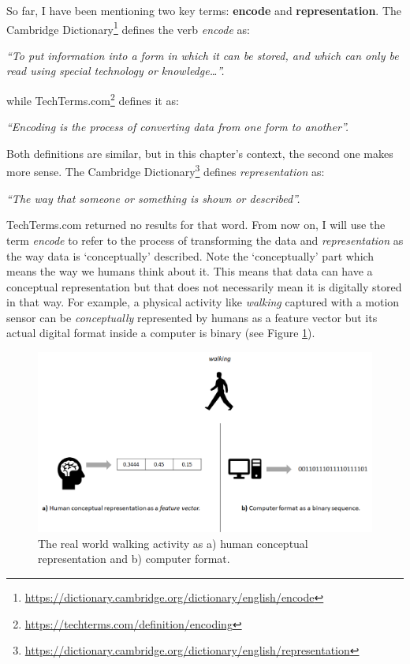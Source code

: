 \documentclass[
  11pt,
]{krantz}
\renewenvironment{quote}{\begin{VF}}{\end{VF}}
\begin{document}
So far, I have been mentioning two key terms: \textbf{encode} and \textbf{representation}. The Cambridge Dictionary\footnote{\url{https://dictionary.cambridge.org/dictionary/english/encode}} defines the verb \emph{encode} as:

\begin{quote}
\emph{``To put information into a form in which it can be stored, and which can only be read using special technology or knowledge\ldots{}''.}
\end{quote}

while TechTerms.com\footnote{\url{https://techterms.com/definition/encoding}} defines it as:

\begin{quote}
\emph{``Encoding is the process of converting data from one form to another''.}
\end{quote}

Both definitions are similar, but in this chapter's context, the second one makes more sense. The Cambridge Dictionary\footnote{\url{https://dictionary.cambridge.org/dictionary/english/representation}} defines \emph{representation} as:

\begin{quote}
\emph{``The way that someone or something is shown or described''.}
\end{quote}

TechTerms.com returned no results for that word. From now on, I will use the term \emph{encode} to refer to the process of transforming the data and \emph{representation} as the way data is `conceptually' described. Note the `conceptually' part which means the way we humans think about it. This means that data can have a conceptual representation but that does not necessarily mean it is digitally stored in that way. For example, a physical activity like \emph{walking} captured with a motion sensor can be \emph{conceptually} represented by humans as a feature vector but its actual digital format inside a computer is binary (see Figure \ref{fig:conceptualRep}).

\begin{figure}

{\centering \includegraphics[width=0.9\linewidth]{images/conceptual_representation} 

}

\caption{The real world walking activity as a) human conceptual representation and b) computer format.}\label{fig:conceptualRep}
\end{figure}
\end{document}
